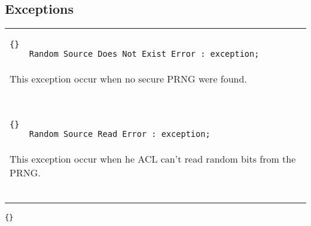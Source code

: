 \subsection{Exceptions}
\begin{tabular}{p{\textwidth}}
  \begin{lstlisting}{}
    Random_Source_Does_Not_Exist_Error : exception;
  \end{lstlisting}\\
  This exception occur when no secure PRNG were  found.\\ \ \\
  \hline\\
  \begin{lstlisting}{}
    Random_Source_Read_Error : exception;
  \end{lstlisting}\\
  This exception occur when he ACL can't read random bits from  the PRNG.\\ 
  \ \\
  \hline\\
\end{tabular}

\begin{lstlisting}{}
\end{lstlisting}

